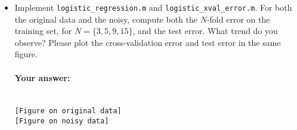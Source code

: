 \begin{itemize}
\paragraph{Your answer:}
 ~\\
 
 {\tt  [Figure on original data]}
 \\    
 
 {\tt [Figure on noisy data]}
 \\
  
 There is an improvement because \ldots  
  \\

\item Implement {\tt logistic\_regression.m} and {\tt logistic\_xval\_error.m}. For both the original data and the noisy, compute both the $N$-fold error on the training set, for $N = \{3, 5, 9, 15\}$, and the test error. What trend do you observe? Please plot the cross-validation error and test error in the same figure.

\paragraph{Your answer:}
 ~\\
 
 {\tt  [Figure on original data]}
 \\    
 
 {\tt [Figure on noisy data]}

\end{itemize}

